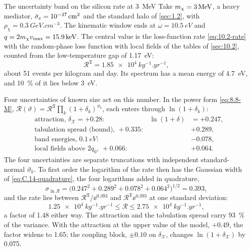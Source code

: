 \begin{workedexample}{The uncertainty band on the silicon rate at \SI{3}{MeV}}\label{we:10-band3}
Take $m_{\chi} = \SI{3}{MeV}$, a heavy mediator, $\bar{\sigma}_{e} = \SI{e-37}{cm^2}$ and the standard halo of \cref{sec:1.2}, with $\rho_\chi = \SI{0.3}{GeV.cm^{-3}}$. The kinematic window ends at $\omega = \SI{10.5}{eV}$ and $q = 2m_{\chi} v_{\mathrm{max}} = \SI{15.9}{keV}$. The central value is the loss-function rate \cref{eq:10.2-rate} with the random-phase loss function with local fields of the tables of \cref{sec:10.2}, counted from the low-temperature gap of \SI{1.17}{eV}:
\begin{equation*}
  \mathcal{R}^{\mathfrak{T}} = \SI{1.85e4}{kg^{-1}.yr^{-1}} ,
\end{equation*}
about 51 events per kilogram and day. Its spectrum has a mean energy of \SI{4.7}{eV}, and \SI{10}{\percent} of it lies below \SI{3}{eV}.

Four uncertainties of known size act on this number. In the power form \cref{eq:8.8-M}, $\mathcal{R}(\vartheta) = \mathcal{R}^{\mathfrak{T}}\prod_k(1 + \delta_k)^{\vartheta_k}$, each enters through $\ln(1 + \delta_k)$:
\begin{equation*}
  \begin{aligned}
  &\text{attraction, } \delta_{\mathcal{X}} = +0.28: & \ln(1 + \delta) &= +0.247, \\
  &\text{tabulation spread (bound), } +0.335: & &+0.289, \\
  &\text{band energies, } \SI{0.1}{eV}: & &-0.078, \\
  &\text{local fields above } 2q_0,\ +0.066: & &+0.064.
  \end{aligned}
\end{equation*}
The four uncertainties are separate truncations with independent standard-normal $\vartheta_k$. To first order the logarithm of the rate then has the Gaussian width of \cref{eq:C.14-quadrature}, the four logarithms added in quadrature,
\begin{equation*}
  \sigma_{\ln\mathcal{R}} = \bigl(0.247^2 + 0.289^2 + 0.078^2 + 0.064^2\bigr)^{1/2} = 0.393 ,
\end{equation*}
and the rate lies between $\mathcal{R}^{\mathfrak{T}}/\ee^{0.393}$ and $\mathcal{R}^{\mathfrak{T}}\ee^{0.393}$ at one standard deviation:
\begin{equation*}
  \SI{1.25e4}{kg^{-1}.yr^{-1}} \le \mathcal{R} \le \SI{2.75e4}{kg^{-1}.yr^{-1}} ,
\end{equation*}
a factor of 1.48 either way. The attraction and the tabulation spread carry \SI{93}{\percent} of the variance. With the attraction at the upper value of the model, $+0.49$, the factor widens to 1.65; the coupling block, $\pm0.10$ on $\delta_{\mathcal{X}}$, changes $\ln(1 + \delta_{\mathcal{X}})$ by 0.075.


\end{workedexample}

